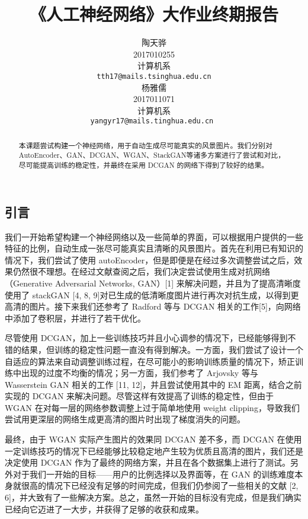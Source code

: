 \documentclass{article}
\title{《人工神经网络》大作业终期报告}
\author{%
  陶天骅 \\
  2017010255 \\
  计算机系 \\
  \texttt{tth17@mails.tsinghua.edu.cn} \\
  \And
  杨雅儒\\
  2017011071 \\
  计算机系 \\
  \texttt{yangyr17@mails.tinghua.edu.cn
  } \\
}
\begin{document}
\begin{CJK*}{UTF8}{gbsn}
\maketitle


\begin{abstract}

本课题尝试构建一个神经网络，用于自动生成尽可能真实的风景图片。我们分别对AutoEncoder、GAN、DCGAN、WGAN、StackGAN等诸多方案进行了尝试和对比，尽可能提高训练的稳定性，并最终在采用 DCGAN 的网络下得到了较好的结果。

\end{abstract}

\section{引言}

  我们一开始希望构建一个神经网络以及一些简单的界面，可以根据用户提供的一些特征的比例，自动生成一张尽可能真实且清晰的风景图片。首先在利用已有知识的情况下，我们尝试了使用 autoEncoder，但是即便是在经过多次调整尝试之后，效果仍然很不理想。在经过文献查阅之后，我们决定尝试使用生成对抗网络（Generative Adversarial Networks, GAN）[1] 来解决问题，并且为了提高清晰度使用了 stackGAN [4, 8, 9]对已生成的低清晰度图片进行再次对抗生成，以得到更高清的图片。接下来我们还参考了 Radford 等与 DCGAN 相关的工作[5]，向网络中添加了卷积层，并进行了若干优化。

  尽管使用 DCGAN，加上一些训练技巧并且小心调参的情况下，已经能够得到不错的结果，但训练的稳定性问题一直没有得到解决。一方面，我们尝试了设计一个自适应的算法来自动调整训练过程，在尽可能小的影响训练质量的情况下，矫正训练中出现的过度不均衡的情况；另一方面，我们参考了 Arjovsky 等与 Wasserstein GAN 相关的工作 [11, 12]，并且尝试使用其中的 EM 距离，结合之前实现的 DCGAN 来解决问题。尽管这样有效提高了训练的稳定性，但由于 WGAN 在对每一层的网络参数调整上过于简单地使用 weight clipping，导致我们尝试用更深层的网络生成更高清的图片时出现了梯度消失的问题。

  最终，由于 WGAN 实际产生图片的效果同 DCGAN 差不多，而 DCGAN 在使用一定训练技巧的情况下已经能够比较稳定地产生较为优质且高清的图片，我们还是决定使用 DCGAN 作为了最终的网络方案，并且在各个数据集上进行了测试。另外对于我们一开始的目标——用户的比例选择以及界面等，在 GAN 的训练难度本身就很高的情况下已经没有足够的时间完成，但我们仍参阅了一些相关的文献 [2, 6]，并大致有了一些解决方案。总之，虽然一开始的目标没有完成，但是我们确实已经向它迈进了一大步，并获得了足够的收获和成果。


\end{CJK*}
\end{document}
